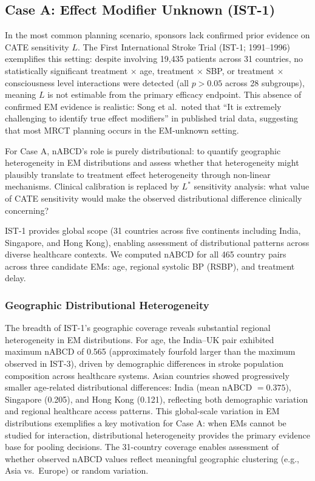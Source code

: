 \documentclass[AMA,Times1COL]{WileyNJDv5}
\begin{document}
\subsection{Case A: Effect Modifier Unknown (IST-1)}\label{sec:case_a}

In the most common planning scenario, sponsors lack confirmed prior evidence on CATE sensitivity $L$. The First International Stroke Trial (IST-1; 1991--1996) exemplifies this setting: despite involving 19,435 patients across 31 countries, no statistically significant treatment $\times$ age, treatment $\times$ SBP, or treatment $\times$ consciousness level interactions were detected (all $p > 0.05$ across 28 subgroups),\cite{chen2000} meaning $L$ is not estimable from the primary efficacy endpoint. This absence of confirmed EM evidence is realistic: Song et al.\ noted that ``It is extremely challenging to identify true effect modifiers'' in published trial data,\cite{song2025} suggesting that most MRCT planning occurs in the EM-unknown setting.

For Case A, nABCD's role is purely distributional: to quantify geographic heterogeneity in EM distributions and assess whether that heterogeneity might plausibly translate to treatment effect heterogeneity through non-linear mechanisms. Clinical calibration is replaced by $L^*$ sensitivity analysis: what value of CATE sensitivity would make the observed distributional difference clinically concerning?

IST-1 provides global scope (31 countries across five continents including India, Singapore, and Hong Kong), enabling assessment of distributional patterns across diverse healthcare contexts. We computed nABCD for all 465 country pairs across three candidate EMs: age, regional systolic BP (RSBP), and treatment delay.

\subsubsection{Geographic Distributional Heterogeneity}\label{sec:case_a_geography}

The breadth of IST-1's geographic coverage reveals substantial regional heterogeneity in EM distributions. For age, the India--UK pair exhibited maximum nABCD of 0.565 (approximately fourfold larger than the maximum observed in IST-3), driven by demographic differences in stroke population composition across healthcare systems. Asian countries showed progressively smaller age-related distributional differences: India (mean nABCD $= 0.375$), Singapore (0.205), and Hong Kong (0.121), reflecting both demographic variation and regional healthcare access patterns. This global-scale variation in EM distributions exemplifies a key motivation for Case A: when EMs cannot be studied for interaction, distributional heterogeneity provides the primary evidence base for pooling decisions. The 31-country coverage enables assessment of whether observed nABCD values reflect meaningful geographic clustering (e.g., Asia vs.\ Europe) or random variation.
\end{document}
